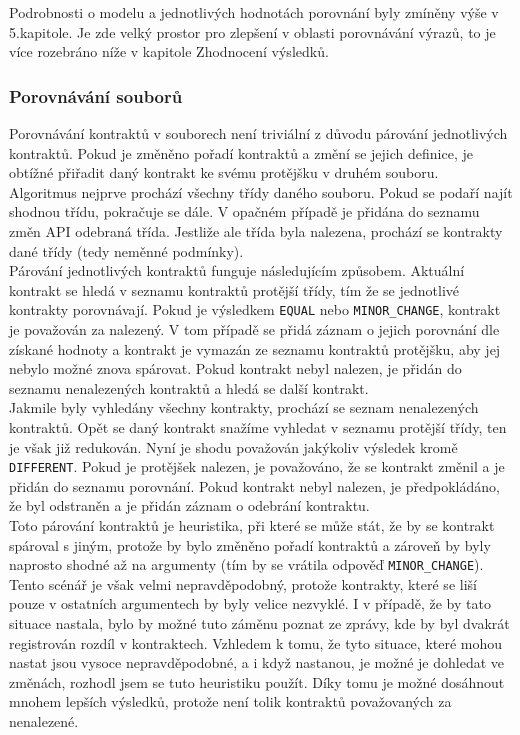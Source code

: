 	    	Podrobnosti o modelu a jednotlivých hodnotách porovnání byly zmíněny výše v 5.kapitole. Je zde velký prostor pro zlepšení v oblasti porovnávání výrazů, to je více rozebráno níže v kapitole Zhodnocení výsledků.
	    
	    \subsubsection{Porovnávání souborů}
	    	Porovnávání kontraktů v souborech není triviální z důvodu párování jednotlivých kontraktů. Pokud je změněno pořadí kontraktů a změní se jejich definice, je obtížné přiřadit daný kontrakt ke svému protějšku v druhém souboru.\\
	    	
	    	Algoritmus nejprve prochází všechny třídy daného souboru. Pokud se podaří najít shodnou třídu, pokračuje se dále. V opačném případě je přidána do seznamu změn API odebraná třída. Jestliže ale třída byla nalezena, prochází se kontrakty dané třídy (tedy neměnné podmínky).\\
	    	
	    	Párování jednotlivých kontraktů funguje následujícím způsobem. Aktuální kontrakt se hledá v seznamu kontraktů protější třídy, tím že se jednotlivé kontrakty porovnávají. Pokud je výsledkem \texttt{EQUAL} nebo \texttt{MINOR\_CHANGE}, kontrakt je považován za nalezený. V tom případě se přidá záznam o jejich porovnání dle získané hodnoty a kontrakt je vymazán ze seznamu kontraktů protějšku, aby jej nebylo možné znova spárovat. Pokud kontrakt nebyl nalezen, je přidán do seznamu nenalezených kontraktů a hledá se další kontrakt.\\
	    	
	    	Jakmile byly vyhledány všechny kontrakty, prochází se seznam nenalezených kontraktů. Opět se daný kontrakt snažíme vyhledat v seznamu protější třídy, ten je však již redukován. Nyní je shodu považován jakýkoliv výsledek kromě \texttt{DIFFERENT}. Pokud je protějšek nalezen, je považováno, že se kontrakt změnil a je přidán do seznamu porovnání. Pokud kontrakt nebyl nalezen, je předpokládáno, že byl odstraněn a je přidán záznam o odebrání kontraktu.\\
	    	
	    	Toto párování kontraktů je heuristika, při které se může stát, že by se kontrakt spároval s jiným, protože by bylo změněno pořadí kontraktů a zároveň by byly naprosto shodné až na argumenty (tím by se vrátila odpověď \texttt{MINOR\_CHANGE}). Tento scénář je však velmi nepravděpodobný, protože kontrakty, které se liší pouze v ostatních argumentech by byly velice nezvyklé. I v případě, že by tato situace nastala, bylo by možné tuto záměnu poznat ze zprávy, kde by byl dvakrát registrován rozdíl v kontraktech. Vzhledem k tomu, že tyto situace, které mohou nastat jsou vysoce nepravděpodobné, a i když nastanou, je možné je dohledat ve změnách, rozhodl jsem se tuto heuristiku použít. Díky tomu je možné dosáhnout mnohem lepších výsledků, protože není tolik kontraktů považovaných za nenalezené.\\
	    	
